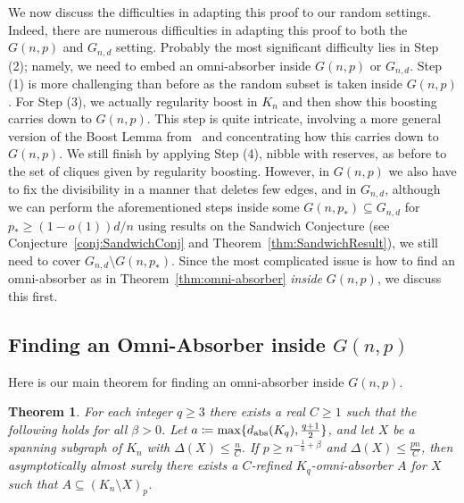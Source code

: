 \documentclass[11pt]{article}
\numberwithin{equation}{section}
\newcounter{i}
\theoremstyle{plain}
\newtheorem{thm}{Theorem}[section]
\theoremstyle{plain} %
\theoremstyle{definition}
\begin{document}
We now discuss the difficulties in adapting this proof to our random settings.  
Indeed, there are numerous difficulties in adapting this proof to both the $G(n,p)$ and $G_{n,d}$ setting. Probably the most significant difficulty lies in Step (2); namely, we need to embed an omni-absorber inside $G(n,p)$ or $G_{n,d}$. Step (1) is more challenging than before as the random subset is taken inside $G(n,p)$. For Step (3), we actually regularity boost in $K_n$ and then show this boosting carries down to $G(n,p)$.  This step is quite intricate, involving a more general version of the Boost Lemma from~\cite{GKLO16} and concentrating how this carries down to $G(n,p)$. We still finish by applying Step (4), nibble with reserves, as before to the set of cliques given by regularity boosting.
However, in $G(n,p)$ we also have to fix the divisibility in a manner that deletes few edges, and in $G_{n,d}$, although we can perform the aforementioned steps inside some $G(n,p_*) \subseteq G_{n,d}$ for $p_* \geq (1-o(1))d/n$ using results on the Sandwich Conjecture \cite{KV04, GIM20, GIM22} (see Conjecture~\ref{conj:SandwichConj} and Theorem~\ref{thm:SandwichResult}), we still need to cover $G_{n,d}\setminus G(n,p_*)$.  Since the most complicated issue is how to find an omni-absorber as in Theorem~\ref{thm:omni-absorber} \emph{inside} $G(n,p)$, we discuss this first.  

\subsection{Finding an Omni-Absorber inside $G(n,p)$}

Here is our main theorem for finding an omni-absorber inside $G(n,p)$. 

\begin{thm}\label{thm:RandomOmniAbsorber}
    For each integer $q \ge 3$ there exists a real $C\ge 1$ such that the following holds for all $\beta > 0$.  Let $a \coloneqq \max\{d_{\rm abs}(K_q), \frac{q + 1}{2}\}$, and let $X$ be a spanning subgraph of $K_n$ with $\Delta(X)\le \frac{n}{C}$. If $p\ge n^{-\frac{1}{a} + \beta}$ and $\Delta(X) \le \frac{pn}{C}$, then asymptotically almost surely there exists a $C$-refined $K_q$-omni-absorber $A$ for $X$ such that $A \subseteq (K_n\setminus X)_p$. 
\end{thm}
\end{document}

